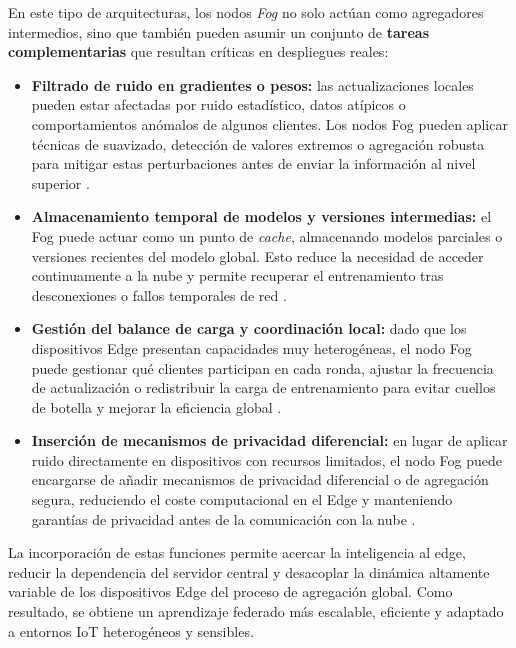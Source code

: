 \documentclass{report}
\begin{document}
En este tipo de arquitecturas, los nodos \textit{Fog} no solo actúan como agregadores intermedios, sino que también pueden asumir un conjunto de \textbf{tareas complementarias} que resultan críticas en despliegues reales\cite{bonomi2012fog,hu2017fog_survey}:

\begin{itemize}
    \item \textbf{Filtrado de ruido en gradientes o pesos:} las actualizaciones locales pueden estar afectadas por ruido estadístico, datos atípicos o comportamientos anómalos de algunos clientes. Los nodos Fog pueden aplicar técnicas de suavizado, detección de valores extremos o agregación robusta para mitigar estas perturbaciones antes de enviar la información al nivel superior \cite{qi2024aggregation_survey}. 
    \item \textbf{Almacenamiento temporal de modelos y versiones intermedias:} el Fog puede actuar como un punto de \textit{cache}, almacenando modelos parciales o versiones recientes del modelo global. Esto reduce la necesidad de acceder continuamente a la nube y permite recuperar el entrenamiento tras desconexiones o fallos temporales de red \cite{bonomi2012fog,hu2017fog_survey,maia2024cloud_edge_3c}.

    \item \textbf{Gestión del balance de carga y coordinación local:} dado que los dispositivos Edge presentan capacidades muy heterogéneas, el nodo Fog puede gestionar qué clientes participan en cada ronda, ajustar la frecuencia de actualización o redistribuir la carga de entrenamiento para evitar cuellos de botella y mejorar la eficiencia global \cite{trindade2024resource_mgmt_fl,cilic2024reactive_hfl}.

    \item \textbf{Inserción de mecanismos de privacidad diferencial:} en lugar de aplicar ruido directamente en dispositivos con recursos limitados, el nodo Fog puede encargarse de añadir mecanismos de privacidad diferencial o de agregación segura, reduciendo el coste computacional en el Edge y manteniendo garantías de privacidad antes de la comunicación con la nube  \cite{islam2025pphffl,qiu2025hierarchical_aggregation}.
\end{itemize}

La incorporación de estas funciones permite acercar la inteligencia al edge, reducir la dependencia del servidor central y desacoplar la dinámica altamente variable de los dispositivos Edge del proceso de agregación global. Como resultado, se obtiene un aprendizaje federado más escalable, eficiente y adaptado a entornos IoT heterogéneos y sensibles.
\end{document}
